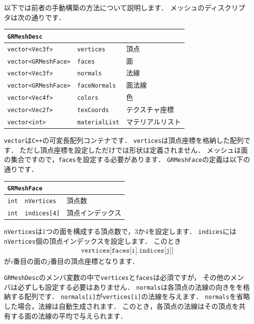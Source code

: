\KLUDGE 以下では前者の手動構築の方法について説明します．
\KLUDGE メッシュのディスクリプタは次の通りです．
\begin{center}
\begin{tabular}{p{.3\hsize}p{.3\hsize}p{.3\hsize}}
\multicolumn{3}{l}{\texttt{GRMeshDesc}}					\\ \midrule
\texttt{vector<Vec3f>}		&	\texttt{vertices}		& \KLUDGE 頂点	 			\\
\texttt{vector<GRMeshFace>}	&	\texttt{faces}			& \KLUDGE 面	 			\\
\texttt{vector<Vec3f>}		&	\texttt{normals}		& \KLUDGE 法線				\\
\texttt{vector<GRMeshFace>}	&	\texttt{faceNormals}	& \KLUDGE 面法線			\\
\texttt{vector<Vec4f>}		&	\texttt{colors}			& \KLUDGE 色				\\
\texttt{vector<Vec2f>}		&	\texttt{texCoords}		& \KLUDGE テクスチャ座標	\\
\texttt{vector<int>}		&	\texttt{materialList}	& \KLUDGE マテリアルリスト
\end{tabular}
\end{center}
\texttt{vector}\KLUDGE は\texttt{C++}\KLUDGE の可変長配列コンテナです．
\texttt{vertices}\KLUDGE は頂点座標を格納した配列です．
\KLUDGE ただし頂点座標を設定しただけでは形状は定義されません．
\KLUDGE メッシュは面の集合ですので，\texttt{faces}\KLUDGE を設定する必要があります．
\texttt{GRMeshFace}\KLUDGE の定義は以下の通りです．
\begin{center}
\begin{tabular}{p{.3\hsize}p{.3\hsize}p{.3\hsize}}
\multicolumn{3}{l}{\texttt{GRMeshFace}}					\\ \midrule
\texttt{int}	&	\texttt{nVertices}		& \KLUDGE 頂点数 	\\
\texttt{int}	&	\texttt{indices[4]}		& \KLUDGE 頂点インデックス
\end{tabular}
\end{center}
\texttt{nVertices}\KLUDGE は1\KLUDGE つの面を構成する頂点数で，3\KLUDGE か4\KLUDGE を設定します．
\texttt{indices}\KLUDGE には\texttt{nVertices}\KLUDGE 個の頂点インデックスを設定します．
\KLUDGE このとき
\begin{align*}
\texttt{vertices[faces[i].indices[j]]}
\end{align*}
\KLUDGE が$i$\KLUDGE 番目の面の$j$\KLUDGE 番目の頂点座標となります．

\texttt{GRMeshDesc}\KLUDGE のメンバ変数の中で\texttt{vertices}\KLUDGE と\texttt{faces}\KLUDGE は必須ですが，
\KLUDGE その他のメンバは必ずしも設定する必要はありません．
\texttt{normals}\KLUDGE は各頂点の法線の向きをを格納する配列です．
\texttt{normals[i]}\KLUDGE が\texttt{vertices[i]}\KLUDGE の法線を与えます．
\texttt{normals}\KLUDGE を省略した場合，法線は自動生成されます．
\KLUDGE このとき，各頂点の法線はその頂点を共有する面の法線の平均で与えられます．

